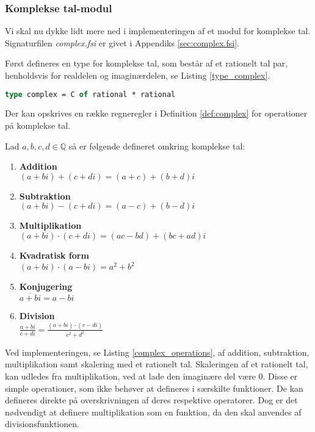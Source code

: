 \subsubsection{Komplekse tal-modul}
Vi skal nu dykke lidt mere ned i implementeringen af et modul for komplekse tal. Signaturfilen \textit{complex.fsi} er givet i Appendiks \ref{sec:complex.fsi}. 

Først defineres en type for komplekse tal, som består af et rationelt tal par, henholdsvis for realdelen og imaginærdelen, se Listing \ref{type_complex}.

\begin{lstlisting}[language={FSharp}, 
    label={type_complex},
    caption={Typen for komplekse tal}]
type complex = C of rational * rational
\end{lstlisting}

Der kan opskrives en række regneregler i Definition \ref{def:complex} for operationer på komplekse tal. 
\vspace{0.5cm}
\begin{definition}\label{def:complex}
  Lad $a, b, c, d \in \mathbb{Q}$ så er følgende defineret omkring komplekse tal:
  \begin{enumerate}
    \item \textbf{Addition} \\ $(a + bi) + (c + di) = (a + c) + (b + d)i$
    \item \textbf{Subtraktion} \\ $(a + bi) - (c + di) = (a - c) + (b - d)i$
    \item \textbf{Multiplikation} \\ $(a + bi) \cdot (c + di) = (ac - bd) + (bc + ad)i$
    \item \textbf{Kvadratisk form} \\ $ (a + bi) \cdot (a - bi) = a^2 + b^2$
    \item \textbf{Konjugering} \\ $\overline{a + bi} = a - bi$
    \item \textbf{Division} \\ $\frac{a + bi}{c + di} = \frac{(a + bi)\cdot(c - di)}{c^2 + d^2}$
  \end{enumerate}
\end{definition}

Ved implementeringen, se Listing \ref{complex_operations}, af addition, subtraktion, multiplikation samt skalering med et rationelt tal. Skaleringen af et rationelt tal, kan udledes fra multiplikation, ved at lade den imaginære del være $0$. Disse er simple operationer, som ikke behøver at defineres i særskilte funktioner. De kan defineres direkte på overskrivningen af deres respektive operatorer. Dog er det nødvendigt at definere multiplikation som en funktion, da den skal anvendes af divisionsfunktionen. 

